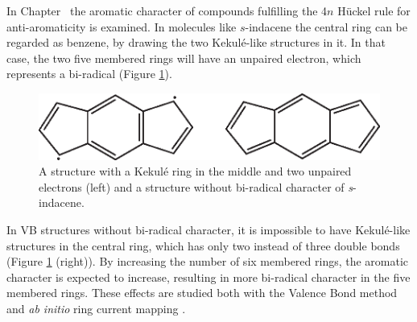 In Chapter \chindacene\ the aromatic character of compounds fulfilling the 4$n$ H\"{u}ckel rule for anti-aromaticity is examined. In molecules like $s$-indacene the central ring can be regarded as benzene, by drawing the two Kekul\'e-like structures in it. In that case, the two five membered rings will have an unpaired electron, which represents a bi-radical (Figure \ref{ch1.fig.indacene}). 
\begin{figure}[htdp]
\center
\includegraphics{introduction/figures/indacene.eps}
\caption{A structure with a Kekul\'e ring in the middle and two unpaired electrons (left) and a structure without bi-radical character of \textit{s}-indacene.}
\label{ch1.fig.indacene}
\end{figure}
In VB structures without bi-radical character, it is impossible to have Kekul\'e-like structures in the central ring, which has only two instead of three double bonds (Figure \ref{ch1.fig.indacene} (right)). By increasing the number of six membered rings, the aromatic character is expected to increase, resulting in more bi-radical character in the five membered rings. These effects are studied both with the Valence Bond method and \textit{ab initio} ring current mapping \cite{indacene}.  


 

